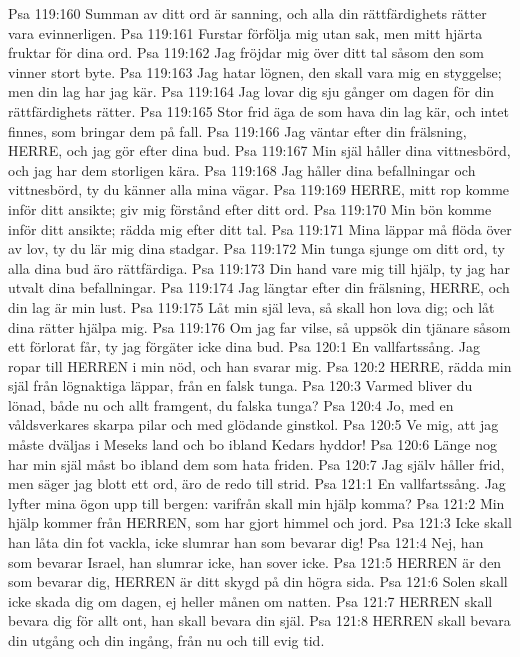 Psa 119:160  Summan av ditt ord är sanning, och alla din rättfärdighets rätter vara evinnerligen.
Psa 119:161  Furstar förfölja mig utan sak, men mitt hjärta fruktar för dina ord.
Psa 119:162  Jag fröjdar mig över ditt tal såsom den som vinner stort byte.
Psa 119:163  Jag hatar lögnen, den skall vara mig en styggelse; men din lag har jag kär.
Psa 119:164  Jag lovar dig sju gånger om dagen för din rättfärdighets rätter.
Psa 119:165  Stor frid äga de som hava din lag kär, och intet finnes, som bringar dem på fall.
Psa 119:166  Jag väntar efter din frälsning, HERRE, och jag gör efter dina bud.
Psa 119:167  Min själ håller dina vittnesbörd, och jag har dem storligen kära.
Psa 119:168  Jag håller dina befallningar och vittnesbörd, ty du känner alla mina vägar.
Psa 119:169  HERRE, mitt rop komme inför ditt ansikte; giv mig förstånd efter ditt ord.
Psa 119:170  Min bön komme inför ditt ansikte; rädda mig efter ditt tal.
Psa 119:171  Mina läppar må flöda över av lov, ty du lär mig dina stadgar.
Psa 119:172  Min tunga sjunge om ditt ord, ty alla dina bud äro rättfärdiga.
Psa 119:173  Din hand vare mig till hjälp, ty jag har utvalt dina befallningar.
Psa 119:174  Jag längtar efter din frälsning, HERRE, och din lag är min lust.
Psa 119:175  Låt min själ leva, så skall hon lova dig; och låt dina rätter hjälpa mig.
Psa 119:176  Om jag far vilse, så uppsök din tjänare såsom ett förlorat får, ty jag förgäter icke dina bud.
Psa 120:1  En vallfartssång. Jag ropar till HERREN i min nöd, och han svarar mig.
Psa 120:2  HERRE, rädda min själ från lögnaktiga läppar, från en falsk tunga.
Psa 120:3  Varmed bliver du lönad, både nu och allt framgent, du falska tunga?
Psa 120:4  Jo, med en våldsverkares skarpa pilar och med glödande ginstkol.
Psa 120:5  Ve mig, att jag måste dväljas i Meseks land och bo ibland Kedars hyddor!
Psa 120:6  Länge nog har min själ måst bo ibland dem som hata friden.
Psa 120:7  Jag själv håller frid, men säger jag blott ett ord, äro de redo till strid.
Psa 121:1  En vallfartssång. Jag lyfter mina ögon upp till bergen: varifrån skall min hjälp komma?
Psa 121:2  Min hjälp kommer från HERREN, som har gjort himmel och jord.
Psa 121:3  Icke skall han låta din fot vackla, icke slumrar han som bevarar dig!
Psa 121:4  Nej, han som bevarar Israel, han slumrar icke, han sover icke.
Psa 121:5  HERREN är den som bevarar dig, HERREN är ditt skygd på din högra sida.
Psa 121:6  Solen skall icke skada dig om dagen, ej heller månen om natten.
Psa 121:7  HERREN skall bevara dig för allt ont, han skall bevara din själ.
Psa 121:8  HERREN skall bevara din utgång och din ingång, från nu och till evig tid.
